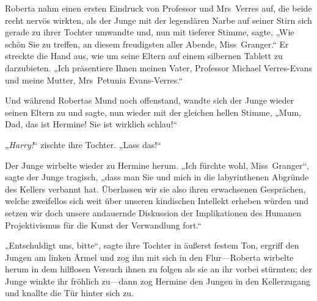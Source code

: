 Roberta nahm einen ersten Eindruck von Professor und Mrs~Verres auf, die beide recht nervös wirkten, als der Junge mit der legendären Narbe auf seiner Stirn sich gerade zu ihrer Tochter umwandte und, nun mit tieferer Stimme, sagte,
„Wie schön Sie zu treffen, an diesem freudigsten aller Abende, Miss~Granger.“ Er streckte die Hand aus, wie um seine Eltern auf einem silbernen Tablett zu darzubieten.
„Ich präsentiere Ihnen meinen Vater, Professor Michael Verres-Evans und meine Mutter, Mrs~Petunia Evans-Verres.“

Und während Robertas Mund noch offenstand, wandte sich der Junge wieder seinen Eltern zu und sagte, nun wieder mit der gleichen hellen Stimme,
„Mum, Dad, das ist Hermine! Sie ist wirklich schlau!“

„\emph{Harry!}“ zischte ihre Tochter.
„Lass das!“

Der Junge wirbelte wieder zu Hermine herum.
„Ich fürchte wohl, Miss~Granger“, sagte der Junge tragisch, „dass man Sie und mich in die labyrinthenen Abgründe des Kellers verbannt hat. Überlassen wir sie also ihren erwachsenen Gesprächen, welche zweifellos sich weit über unseren kindischen Intellekt erheben würden und setzen wir doch unsere andauernde Diskussion der Implikationen des Humanen Projektivismus für die Kunst der Verwandlung fort.“

„Entschuldigt uns, bitte“, sagte ihre Tochter in äußerst festem Ton, ergriff den Jungen am linken Ärmel und zog ihn mit sich in den Flur—Roberta wirbelte herum in dem hilflosen Versuch ihnen zu folgen als sie an ihr vorbei stürmten; der Junge winkte ihr fröhlich zu—dann zog Hermine den Jungen in den Kellerzugang und knallte die Tür hinter sich zu.

